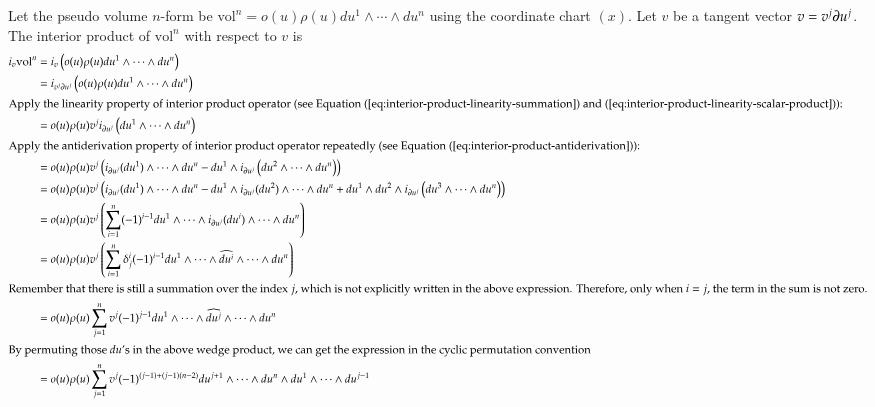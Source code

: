 \documentclass[11pt, a4paper]{book}
\begin{document}
\begin{enumerate}
  Let the pseudo volume $n$-form be
  $\mathrm{vol}^n = o(u) \rho(u) du^1 \wedge \cdots \wedge du^n$ using the coordinate
  chart $(x)$. Let $v$ be a tangent vector $v = v^j \boldsymbol{\partial}u^j$. The interior
  product of $\mathrm{vol}^n$ with respect to $v$ is
  \begin{align*}
    i_v \mathrm{vol}^n
    &= i_v \left( o(u) \rho(u) du^1 \wedge \cdots \wedge du^n \right) \\
    &= i_{v^j \vect{\pdiff}u^j} \left( o(u) \rho(u) du^1 \wedge \cdots \wedge du^n \right)
    \\
    \intertext{Apply the linearity property of interior product operator (see Equation
    (\ref{eq:interior-product-linearity-summation}) and
    (\ref{eq:interior-product-linearity-scalar-product})):}
    &= o(u) \rho(u) v^j i_{\vect{\pdiff}u^j} \left( du^1 \wedge \cdots \wedge du^n \right)
    \\
    \intertext{Apply the antiderivation property of interior product operator repeatedly
    (see Equation (\ref{eq:interior-product-antiderivation})):}
    &= o(u) \rho(u) v^j \left( i_{\vect{\pdiff}u^j}(du^1) \wedge \cdots \wedge du^n - du^1
      \wedge i_{\vect{\pdiff}u^j}\left( du^2 \wedge \cdots \wedge du^n \right) \right) \\
    &= o(u) \rho(u) v^j \left( i_{\vect{\pdiff}u^j}(du^1) \wedge \cdots \wedge du^n -
      du^1 \wedge i_{\vect{\pdiff}u^j}(du^2) \wedge \cdots \wedge du^n + du^1 \wedge du^2
      \wedge i_{\vect{\pdiff}u^j}\left( du^3 \wedge \cdots \wedge du^n \right) \right) \\
    &= o(u) \rho(u) v^j \left( \sum_{i=1}^n (-1)^{i-1} du^1 \wedge \cdots
      \wedge i_{\vect{\pdiff}u^j}(du^i) \wedge \cdots \wedge du^n \right) \\
    &= o(u) \rho(u) v^j \left( \sum_{i=1}^n \delta^i_j (-1)^{i-1} du^1 \wedge \cdots
      \wedge \widehat{du^i} \wedge \cdots \wedge du^n \right) \\
    \intertext{Remember that there is still a summation over the index $j$, which is not
    explicitly written in the above expression. Therefore, only when $i=j$, the term in
    the sum is not zero.}
    &= o(u) \rho(u) \sum_{j=1}^n v^j (-1)^{j-1} du^1 \wedge \cdots \wedge \widehat{du^j}
      \wedge \cdots \wedge du^n \\
    \intertext{By permuting those $du$'s in the above wedge product, we can get the expression
    in the cyclic permutation convention}
    &= o(u) \rho(u) \sum_{j=1}^n v^j (-1)^{(j-1)+(j-1)(n-2)} du^{j+1} \wedge \cdots
      \wedge du^n \wedge du^1 \wedge \cdots \wedge du^{j-1} \\

\end{align*}
\end{enumerate}
\end{document}
